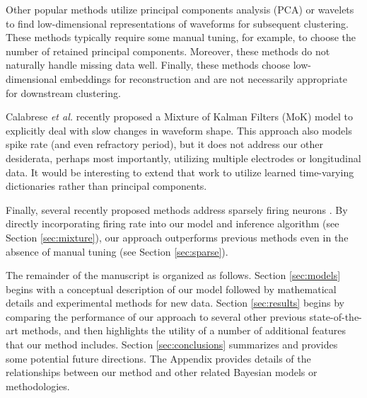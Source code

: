 \documentclass[journal]{IEEEtran}
\begin{document}

Other popular methods utilize principal components analysis (PCA) \cite{Lewicki} or wavelets \cite{Letelier2000} to find low-dimensional representations of waveforms for subsequent clustering.  These methods typically require some manual tuning, for example, to choose the number of retained principal components.  Moreover, these methods do not naturally handle missing data well. Finally, these methods choose low-dimensional embeddings for reconstruction and are not necessarily appropriate for downstream clustering. 


Calabrese \emph{et al.} \cite{Calabrese2010} recently proposed a Mixture of Kalman Filters (MoK) model to explicitly deal with slow changes in waveform shape.  This approach also models spike rate (and even refractory period), but it does not address our other desiderata, perhaps most importantly, utilizing multiple electrodes or longitudinal data. It would be interesting to extend that work to utilize learned time-varying dictionaries rather than principal components.

Finally, several recently proposed methods address sparsely firing neurons \cite{Pedreira2012, Adamos2012}.  By directly incorporating firing rate into our model and inference algorithm (see Section \ref{sec:mixture}), our approach outperforms previous methods even in the absence of manual tuning (see Section \ref{sec:sparse}).

The remainder of the manuscript is organized as follows.  Section \ref{sec:models} begins with a conceptual description of our model followed by mathematical details and experimental methods for new data. Section \ref{sec:results} begins by comparing the performance of our approach to several other previous state-of-the-art methods, and then highlights the utility of a number of additional features that our method includes.  Section \ref{sec:conclusions}  summarizes and provides some potential future directions.  The Appendix provides details of the relationships between our method and other related Bayesian models or methodologies.
\end{document}
